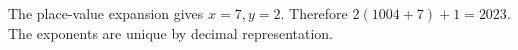 The place-value expansion gives $x=7,y=2$. Therefore $2(1004+7)+1=\boxed{2023}$. The exponents are unique by decimal representation.
